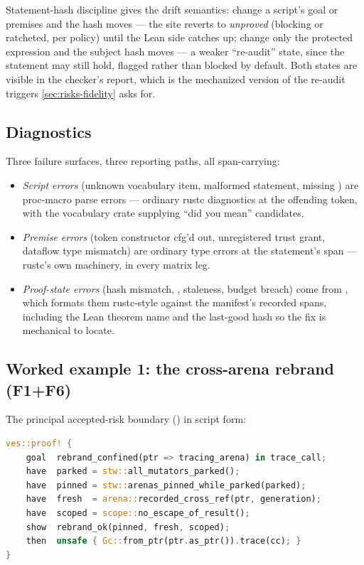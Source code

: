 Statement-hash discipline gives the drift semantics: change a
script's goal or premises and the hash moves --- the site reverts to
\emph{unproved} (blocking or ratcheted, per policy) until the Lean
side catches up; change only the protected expression and the subject
hash moves --- a weaker ``re-audit'' state, since the statement may
still hold, flagged rather than blocked by default. Both states are
visible in the checker's report, which is the mechanized version of
the re-audit triggers \cref{sec:risks-fidelity} asks for.

\subsection{Diagnostics}
\label{sec:dsl-diag}

Three failure surfaces, three reporting paths, all span-carrying:

\begin{itemize}[leftmargin=1.4em]
\item \emph{Script errors} (unknown vocabulary item, malformed
  statement, missing ) are proc-macro parse errors ---
  ordinary rustc diagnostics at the offending token, with the
  vocabulary crate supplying ``did you mean'' candidates.
\item \emph{Premise errors} (token constructor cfg'd out, unregistered
  trust grant, dataflow type mismatch) are ordinary type errors at the
   statement's span --- rustc's own machinery, in every
  matrix leg.
\item \emph{Proof-state errors} (hash mismatch, ,
  staleness, budget breach) come from , which formats
  them rustc-style against the manifest's recorded spans, including
  the Lean theorem name and the last-good hash so the fix is
  mechanical to locate.
\end{itemize}

\subsection{Worked example 1: the cross-arena rebrand (F1+F6)}
\label{sec:dsl-example-rebrand}

The principal accepted-risk boundary () in
script form:

\begin{lstlisting}[language=Rust,
  morekeywords={goal,have,show,then,trust,note}]
ves::proof! {
    goal  rebrand_confined(ptr => tracing_arena) in trace_call;
    have  parked = stw::all_mutators_parked();
    have  pinned = stw::arenas_pinned_while_parked(parked);
    have  fresh  = arena::recorded_cross_ref(ptr, generation);
    have  scoped = scope::no_escape_of_result();
    show  rebrand_ok(pinned, fresh, scoped);
    then  unsafe { Gc::from_ptr(ptr.as_ptr()).trace(cc); }
}
\end{lstlisting}

